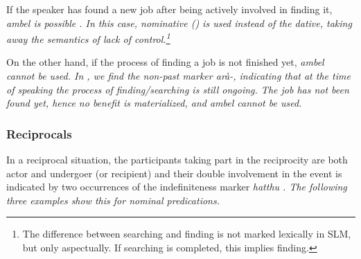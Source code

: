 If the speaker has found a new job after being actively involved in finding it, \em ambel \em is possible . In this case, nominative (\zero) is used instead of the dative, taking away the semantics of lack of control.\footnote{The difference between searching and finding is not marked lexically in SLM, but only aspectually. If searching is completed, this implies finding.}



On the other hand, if the process of finding a job is not finished yet, \em ambel \em cannot be used. In , we find the non-past marker \em arà-\em, indicating that at the time of speaking the process of finding/searching is still ongoing. The job has not been found yet, hence no benefit is materialized, and \em ambel \em cannot be used.




\subsubsection{Reciprocals}\label{sec:func:Reciprocals}
In a reciprocal situation, the participants taking part in the reciprocity are both actor and undergoer (or recipient) and their double involvement in the event is indicated by two occurrences of the indefiniteness marker \em hatthu \em {}. The following three examples show this for nominal predications.


